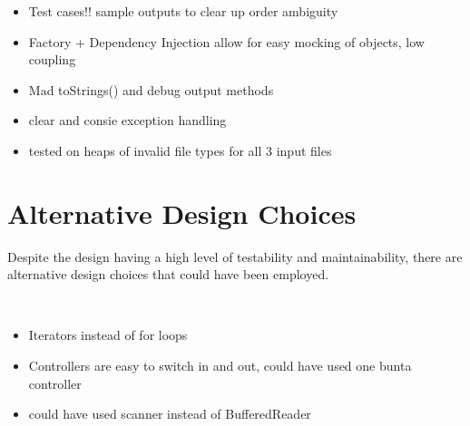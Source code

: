 \documentclass[]{article}
\begin{document}
\begin{itemize}
	\item Test cases!! sample outputs to clear up order ambiguity
	\item Factory  + Dependency Injection allow for easy mocking of objects, low coupling
	\item Mad toStrings() and debug output methods
	\item clear and consie exception handling
	\item tested on heaps of invalid file types for all 3 input files
\end{itemize}


\section*{Alternative Design Choices}

Despite the design having a high level of testability and maintainability, there are alternative design choices that could have been employed.

\
\begin{itemize}
	\item Iterators instead of for loops
	\item Controllers are easy to switch in and out, could have used one bunta controller
	\item could have used scanner instead of BufferedReader
\end{itemize}

\end{document}
